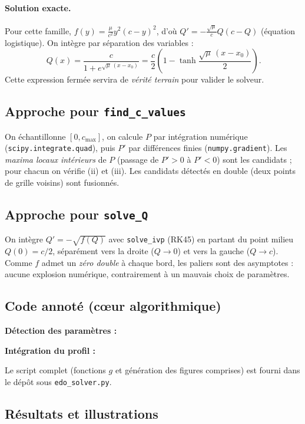 \documentclass[11pt,a4paper]{article}
\theoremstyle{plain}
\theoremstyle{remark}
\begin{document}
\paragraph{Solution exacte.} Pour cette famille, $f(y)=\frac{\mu}{c^2}y^2(c-y)^2$,
d'où $Q'=-\frac{\sqrt{\mu}}{c}Q(c-Q)$ (équation logistique). On intègre par
séparation des variables :
\begin{equation}\label{eq:exacte}
  \boxed{\,Q(x)=\frac{c}{1+e^{\sqrt{\mu}\,(x-x_0)}}
        =\frac{c}{2}\left(1-\tanh\frac{\sqrt{\mu}\,(x-x_0)}{2}\right).}
\end{equation}
Cette expression fermée servira de \emph{vérité terrain} pour valider le solveur.

\subsection{Approche pour \texttt{find\_c\_values}}
On échantillonne $[0,c_{\max}]$, on calcule $P$ par intégration numérique
(\texttt{scipy.integrate.quad}), puis $P'$ par différences finies
(\texttt{numpy.gradient}). Les \emph{maxima locaux intérieurs} de $P$ (passage de
$P'>0$ à $P'<0$) sont les candidats ; pour chacun on vérifie (ii) et (iii). Les
candidats détectés en double (deux points de grille voisins) sont fusionnés.

\subsection{Approche pour \texttt{solve\_Q}}
On intègre $Q'=-\sqrt{f(Q)}$ avec \texttt{solve\_ivp} (RK45) en partant du point
milieu $Q(0)=c/2$, séparément vers la droite ($Q\to0$) et vers la gauche
($Q\to c$). Comme $f$ admet un \emph{zéro double} à chaque bord, les paliers sont
des asymptotes : aucune explosion numérique, contrairement à un mauvais choix de
paramètres.

\subsection{Code annoté (cœur algorithmique)}
\noindent\textbf{Détection des paramètres :}


\noindent\textbf{Intégration du profil :}


\noindent Le script complet (fonctions $g$ et génération des figures comprises)
est fourni dans le dépôt sous \texttt{edo\_solver.py}.

\subsection{Résultats et illustrations}
\end{document}
